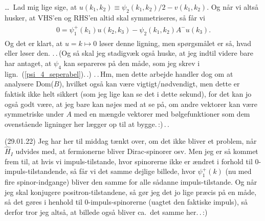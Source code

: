 \documentclass{report}
\begin{document}
\ldots\ Lad mig lige sige, at $u(k_1, k_2) \equiv \psi_2(k_1, k_2)/2 - v(k_1, k_2)$. Og når vi altså husker, at VHS'en og RHS'en altid skal symmetriseres, så får vi 
\begin{align}
\begin{aligned}
	0 = \psi_1^+(k_1) u(k_2, k_3) - \psi_2(k_1, k_2) A^- u(k_3).
	\label{u_lign1}
\end{aligned}
\end{align}
Og det er klart, at $u = k \mapsto 0$ løser denne ligning, men spørgsmålet er så, hvad eller løser den. .\,.\,(Og så skal jeg stadigvæk også huske, at jeg indtil videre bare har antaget, at $\psi_4$ kan separeres på den måde, som jeg skrev i lign.\ (\ref{psi_4_seperabel}).\,.) .\,.\,Hm, men dette arbejde handler dog om at analysere Dom($B$), hvilket også kan være vigtigt/nødvendigt, men dette er faktisk ikke helt sikkert (som jeg lige kan se det i dette sekund), for det kan jo også godt være, at jeg bare kan nøjes med at se på, om andre vektorer kan være symmetriske under $A$ med en mængde vektorer med bølgefunktioner som dem ovenstående ligninger her lægger op til at bygge.\,:)\,.\,.


(29.01.22) Jeg har her til middag tænkt over, om det ikke bliver et problem, når $\hat H_I$ udvides med, at fermionerne bliver Dirac-spinorer osv. Men jeg er så kommet frem til, at hvis vi impuls-tilstande, hvor spinorerne ikke er ændret i forhold til 0-impuls-tilstandende, så får vi det samme dejlige billede, hvor $\psi_1^+(k)$ (nu med fire spinor-indgange) bliver den samme for alle sådanne impuls-tilstande. Og når jeg skal konjugere positron-tilstandene, så gør jeg det jo lige præcis på en måde, så det gøres i henhold til 0-impuls-spinorerne (uagtet den faktiske impuls), så derfor tror jeg altså, at billede også bliver ca.\ det samme her.\,.\,:)   
\end{document}
